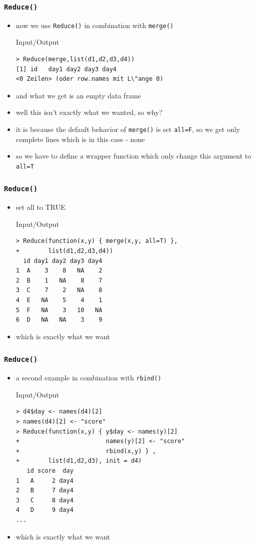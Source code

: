 \documentclass[xcolor={table},c]{beamer}
\begin{document}
\begin{frame}[fragile]\frametitle{\texttt{Reduce()}}
  \begin{itemize}
  \item now we use \texttt{Reduce()} in combination with \texttt{merge()}
  \begin{exampleblock}{Input/Output}
\begin{verbatim}
> Reduce(merge,list(d1,d2,d3,d4))
[1] id   day1 day2 day3 day4
<0 Zeilen> (oder row.names mit L\"ange 0)
\end{verbatim}
  \end{exampleblock}
\item and what we get is an empty data frame
\item well this isn't exactly what we wanted, so why?
\item it is because the default behavior of \texttt{merge()} is set \texttt{all=F}, so we get only complete lines which is in this case - none
\item so we have to define a wrapper function which only change this argument to \texttt{all=T}
  \end{itemize}

\end{frame}


\begin{frame}[fragile]\frametitle{\texttt{Reduce()}}
  \begin{itemize}
  \item set all to TRUE
  \begin{exampleblock}{Input/Output}\small
\begin{verbatim}
> Reduce(function(x,y) { merge(x,y, all=T) },
+        list(d1,d2,d3,d4))
  id day1 day2 day3 day4
1  A    3    8   NA    2
2  B    1   NA    8    7
3  C    7    2   NA    8
4  E   NA    5    4    1
5  F   NA    3   10   NA
6  D   NA   NA    3    9
\end{verbatim}
  \end{exampleblock}
\item which is exactly what we want
  \end{itemize}
\end{frame}

\begin{frame}[fragile]\frametitle{\texttt{Reduce()}}
  \begin{itemize}
  \item a second example in combination with \texttt{rbind()}
  \begin{exampleblock}{Input/Output}\small
\begin{verbatim}
> d4$day <- names(d4)[2]
> names(d4)[2] <- "score"
> Reduce(function(x,y) { y$day <- names(y)[2]
+                        names(y)[2] <- "score"
+                        rbind(x,y) } ,
+        list(d1,d2,d3), init = d4)
   id score  day
1   A     2 day4
2   B     7 day4
3   C     8 day4
4   D     9 day4
...
\end{verbatim}
  \end{exampleblock}
\item which is exactly what we want
  \end{itemize}
\end{frame}
\end{document}
